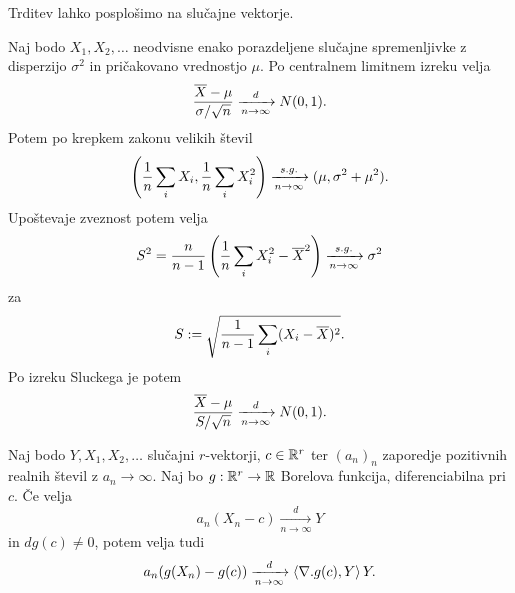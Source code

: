 \begin{remark}
  Trditev lahko posplošimo na slučajne vektorje.
\end{remark}

\begin{primer}
  Naj bodo $X_1, X_2, \ldots$ neodvisne enako porazdeljene slučajne
  spremenljivke z disperzijo $\sigma^2$ in pričakovano vrednostjo $\mu$.
  Po centralnem limitnem izreku velja
  \[
	\frac{\overline{X} - \mu}{\sigma / \sqrt{n}} \xrightarrow[n \to \infty]{d} N(0,1).
  \]
  Potem po krepkem zakonu velikih števil
  \[
	\left(
	  \frac{1}{n} \sum_i X_i,
	  \frac{1}{n} \sum_i X_i^2
	\right)
	\xrightarrow[n \to \infty]{s.g.}
	(\mu, \sigma^2 + \mu^2).
  \]
  Upoštevaje zveznost potem velja
  \[
	S^2 = \frac{n}{n-1} \left( \frac{1}{n} \sum_i X_i^2 - \overline{X}^2 \right)
	\xrightarrow[n \to \infty]{s.g.}
	\sigma^2
  \]
  za
  \[
	S := \sqrt{\frac{1}{n-1} \sum_i (X_i - \overline{X})^2}.
  \]
  Po izreku Sluckega je potem
  \[
	\frac{\overline{X} - \mu}{S / \sqrt{n}} \xrightarrow[n \to \infty]{d} N(0,1).
  \]
\end{primer}

\begin{trditev}
  Naj bodo $Y, X_1, X_2, \ldots$ slučajni $r$-vektorji, $c \in \mathbb{R}^r$ ter
  $(a_n)_n$ zaporedje pozitivnih realnih števil z $a_n \to \infty$.
  Naj bo $g: \mathbb{R}^r \to \mathbb{R}$ Borelova funkcija, diferenciabilna pri $c$.
  Če velja
  \[
	a_n (X_n - c) \xrightarrow[n \to \infty]{d} Y
  \]
  in $dg(c) \ne 0$, potem velja tudi
  \[
	a_n (g(X_n) - g(c)) \xrightarrow[n \to \infty]{d} \left< \mathbf{\nabla}{} . g(c), Y \right> Y.
  \]
\end{trditev}

